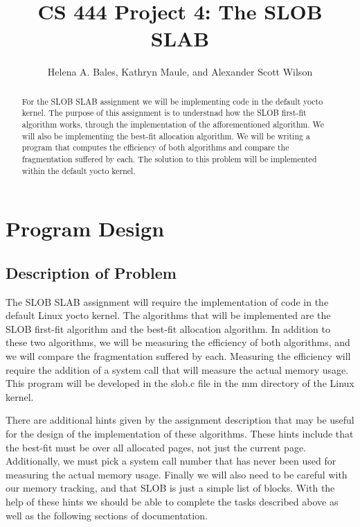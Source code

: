\documentclass[letterpaper,10pt]{article}
\title{CS 444 Project 4: The SLOB SLAB}
\author{Helena A. Bales, Kathryn Maule, and Alexander Scott Wilson }
\begin{document}
\maketitle

\begin{abstract}
   For the SLOB SLAB assignment we will be implementing code in the default yocto kernel. 
   The purpose of this assignment is to understnad how the SLOB first-fit algorithm works, through 
   the implementation of the afforementioned algorithm. We will also be implementing the best-fit 
   allocation algorithm. We will be writing a program that computes the efficiency of both 
   algorithms and compare the fragmentation suffered by each. The solution to this problem will be 
   implemented within the default yocto kernel.
\end{abstract}

\clearpage

\tableofcontents

\clearpage

\section{Program Design}
\subsection{Description of Problem}
The SLOB SLAB assignment will require the implementation of code in the default Linux yocto kernel. 
The algorithms that will be implemented are the SLOB first-fit algorithm and the best-fit allocation
 algorithm. In addition to these two algorithms, we will be measuring the efficiency of both 
 algorithms, and we will compare the fragmentation suffered by each. Measuring the efficiency will 
 require the addition of a system call that will measure the actual memory usage. This program will 
 be developed in the slob.c file in the mm directory of the Linux kernel.

 There are additional hints given by the assignment description that may be useful for the design of
 the implementation of these algorithms. These hints include that the best-fit must be over all 
allocated pages, not just the current page. Additionally, we must pick a system call number that 
has never been used for measuring the actual memory usage. Finally we will also need to be careful
 with our memory tracking, and that SLOB is just a simple list of blocks. With the help of these 
hints we should be able to complete the tasks described above as well as the following sections 
of documentation.
\end{document}
